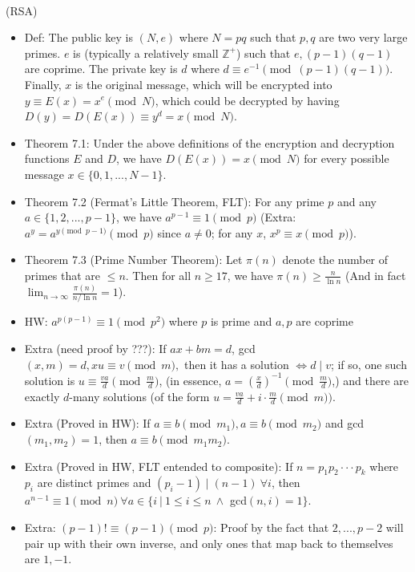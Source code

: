 \documentclass{article}
\begin{document}
\\
(RSA)
\begin{itemize}
	\item Def: The public key is $(N,e)$ where $N = pq$ such that $p,q$ are two very large primes. $e$ is (typically a relatively small $\mathbb{Z^+}$) such that $e,(p-1)(q-1)$ are coprime. The private key is $d$ where $d\equiv e^{-1}\pmod{(p-1)(q-1)}$. Finally, $x$ is the original message, which will be encrypted into $y\equiv E(x) = x^e\pmod{N}$, which could be decrypted by having $D(y) = D(E(x))\equiv y^d = x\pmod{N}$.
	\item Theorem 7.1: Under the above definitions of the encryption and decryption functions $E$ and $D$, we have $D(E(x)) = x \pmod{N}$ for every possible message $x \in \{0,1,...,N-1\}$.
	\item Theorem 7.2 (Fermat's Little Theorem, FLT): For any prime $p$ and any $a\in\{1,2,...,p-1\}$, we have $a^{p-1}\equiv 1 \pmod{p}$ (Extra: $a^y = a^{y\pmod{p-1}}\pmod{p}$ since {\color{red} $a\neq0$}; for any $x$, $x^p\equiv x\pmod{p}$).
	\item Theorem 7.3 (Prime Number Theorem): Let $\pi(n)$ denote the number of primes that are $\leq n$. Then for all $n\geq17$, we have $\pi(n)\geq \frac{n}{\ln n}$ (And in fact $\lim_{n\to\infty}\frac{\pi(n)}{n/\ln n} = 1$).
	\item HW: $a^{p(p-1)}\equiv1\pmod{p^2}$ where $p$ is prime and $a,p$ are coprime
	\item Extra (need proof by ???): If $ax+bm = d$, gcd$(x,m) = d, xu\equiv v\pmod{m},$ then it has a solution $\iff d\mid v$; if so, one such solution is $u\equiv\frac{va}{d}\pmod{\frac{m}{d}}$, (in essence, $a = (\frac{x}{d})^{-1}\pmod{\frac{m}{d}}$,) and there are exactly {\large$d$}-many solutions (of the form $u = \frac{va}{d} + i\cdot\frac{m}{d}\pmod{m}).$
	\item Extra (Proved in HW): If $a\equiv b\pmod{m_1}, a\equiv b\pmod{m_2}$ and gcd$(m_1, m_2) = 1$, then $a\equiv b\pmod{m_1m_2}.$
	\item Extra (Proved in HW, FLT entended to composite): If $n = p_1p_2\cdot\cdot\cdot p_k$ where $p_i$ are distinct primes and $(p_i - 1)\mid(n - 1)\ \forall i$, then $a^{n-1}\equiv1\pmod{n}\ \forall a\in\{i\ |\ 1\leq i\leq n\ \land$ gcd$(n,i) = 1\}.$
	\item Extra: $(p-1)!\equiv(p-1)\pmod{p}$: Proof by the fact that $2,...,p-2$ will pair up with their own inverse, and only ones that map back to themselves are $1, -1$.
\end{itemize}
\end{document}
